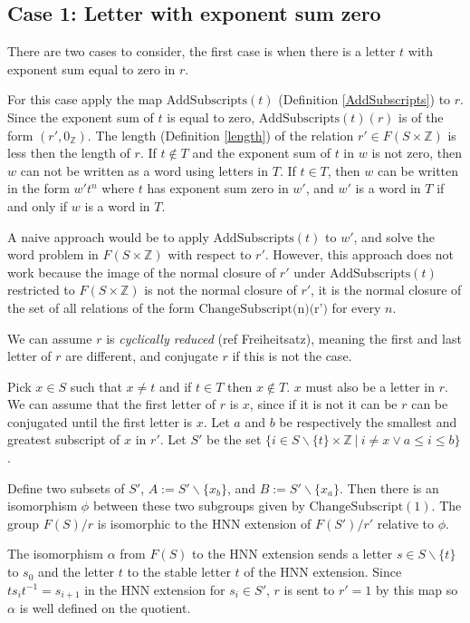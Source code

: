\documentclass[11pt]{article} %
\theoremstyle{definition}
\theoremstyle{definition}
\theoremstyle{definition}
\theoremstyle{definition}
\theoremstyle{definition}
\theoremstyle{definition}
\begin{document}
\subsection{Case 1: Letter with exponent sum zero}\label{expsumzero}
There are two cases to consider, the first case is when there is a letter $t$
with exponent sum equal to zero in $r$.

For this case apply the map $\text{AddSubscripts}(t)$ (Definition \ref{AddSubscripts}) to $r$.
Since the exponent sum of $t$ is equal to zero, $\text{AddSubscripts}(t)(r)$ is
of the form $(r', 0_\mathbb{Z})$.
The length (Definition \ref{length}) of the relation $r' \in F(S \times \mathbb{Z})$
is less then the length of $r$.
If $t \notin T$ and the exponent sum of $t$ in $w$ is not zero, then $w$ can not be
written as a word using letters in $T$. If $t \in T$, then $w$ can be written in the
form $w' t^n$ where $t$ has exponent sum zero in $w'$, and $w'$ is a word in $T$ if
and only if $w$ is a word in $T$.

A naive approach would be to apply $\text{AddSubscripts}(t)$ to $w'$, and solve the word
problem in $F(S \times \mathbb{Z})$ with respect to $r'$. However, this approach does not work
because the image of the normal closure of $r'$ under $\text{AddSubscripts}(t)$ restricted
to $F(S \times \mathbb{Z})$ is not the normal closure of $r'$, it is the normal closure of
the set of all relations of the form $\text{ChangeSubscript(n)(r')}$ for every $n$.

We can assume $r$ is \textit{cyclically reduced} (ref Freiheitsatz), meaning the first and last
letter of $r$ are different, and conjugate $r$ if this is not the case.

Pick $x \in S$ such that $x \ne t$ and if $t \in T$ then $x \notin T$. $x$ must also
be a letter in $r$. We can assume that the first letter of $r$ is
$x$, since if it is not it can be $r$ can be conjugated until the first letter is $x$.
Let $a$ and $b$ be respectively the
smallest and greatest subscript of $x$ in $r'$. Let $S'$ be the set
$\{i \in S \backslash \{t\} \times \mathbb{Z} \ | \ i \ne x \vee a \le i \le b \}$.

Define two subsets of $S'$, $A := S' \backslash \{x_b\}$, and $B := S' \backslash \{x_a\}$.
Then there is an isomorphism $\phi$ between these two subgroups given by $\text{ChangeSubscript}(1)$.
The group $F(S) / r$ is isomorphic to the HNN extension of $F(S') / r'$ relative to $\phi$.

The isomorphism $\alpha$ from $F(S)$ to the HNN extension sends a letter
$s \in S \backslash \{t\}$ to $s_0$ and
the letter $t$ to the stable letter $t$ of the HNN extension. Since $t s_i t^{-1} = s_{i+1}$ in
the HNN extension for $s_i \in S'$, $r$ is sent to $r' = 1$ by this map so $\alpha$ is well defined
on the quotient.
\end{document}
